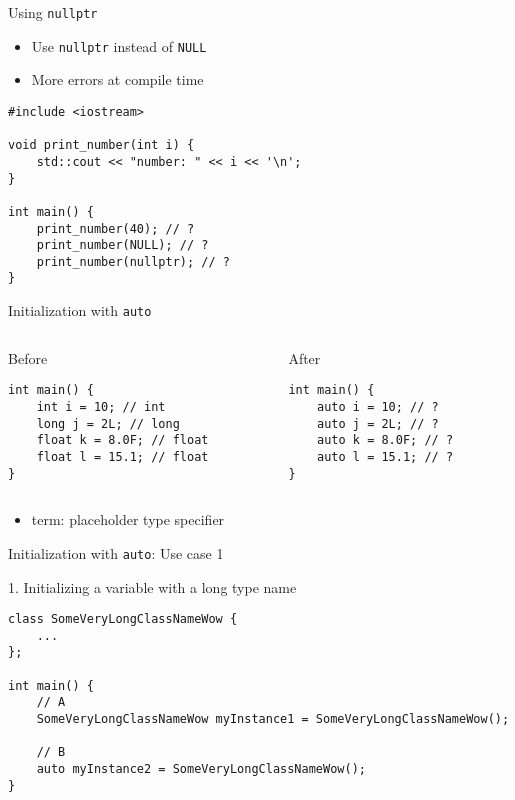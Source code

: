 \documentclass[t]{beamer}
\begin{document}
\begin{frame}[fragile]{Using \texttt{nullptr}}
	\begin{itemize}
		\item Use \texttt{nullptr} instead of \texttt{NULL}
		\item More errors at compile time
	\end{itemize}

	\begin{verbatim}
#include <iostream>

void print_number(int i) {
	std::cout << "number: " << i << '\n';
}

int main() {
	print_number(40); // ?
	print_number(NULL); // ?
	print_number(nullptr); // ?
}
	\end{verbatim}

\end{frame}


\begin{frame}[fragile]{Initialization with \texttt{auto}}
	\begin{columns}[]
		\begin{column}{.5\textwidth}
			{\large Before}
			\begin{verbatim}
int main() {
	int i = 10; // int
	long j = 2L; // long
	float k = 8.0F; // float
	float l = 15.1; // float
}
			\end{verbatim}
		\end{column}
		\begin{column}{.5\textwidth}
			{\large After}
			\begin{verbatim}
int main() {
	auto i = 10; // ?
	auto j = 2L; // ?
	auto k = 8.0F; // ?
	auto l = 15.1; // ?
}
			\end{verbatim}
		\end{column}
	\end{columns}

	\begin{itemize}
		\item term: placeholder type specifier
	\end{itemize}

\end{frame}


\begin{frame}[fragile]{Initialization with \texttt{auto}: Use case 1}

	{\large 1. Initializing a variable with a long type name}

	\begin{verbatim}
class SomeVeryLongClassNameWow {
	...
};

int main() {
	// A
	SomeVeryLongClassNameWow myInstance1 = SomeVeryLongClassNameWow();

	// B
	auto myInstance2 = SomeVeryLongClassNameWow();
}
			\end{verbatim}

\end{frame}
\end{document}
